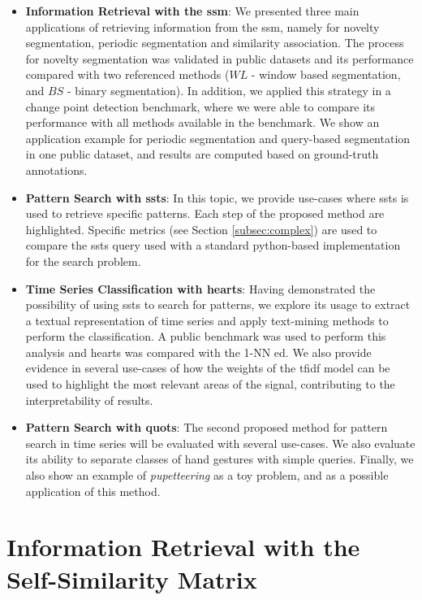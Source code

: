 \begin{itemize}
\item \textbf{Information Retrieval with the \gls{ssm}}:
We presented three main applications of retrieving information from the \gls{ssm}, namely for novelty segmentation, periodic segmentation and similarity association. The process for novelty segmentation was validated in public datasets and its performance compared with two referenced methods ($WL$ - window based segmentation, and $BS$ - binary segmentation). In addition, we applied this strategy in a change point detection benchmark, where we were able to compare its performance with all methods available in the benchmark. We show an application example for periodic segmentation and query-based segmentation in one public dataset, and results are computed based on ground-truth annotations.

\item \textbf{Pattern Search with \gls{ssts}}:
In this topic, we provide use-cases where \gls{ssts} is used to retrieve specific patterns. Each step of the proposed method are highlighted. Specific metrics (see Section \ref{subsec:complex}) are used to compare the \gls{ssts} query used with a standard python-based implementation for the search problem.

\item \textbf{Time Series Classification with \gls{hearts}}:
Having demonstrated the possibility of using \gls{ssts} to search for patterns, we explore its usage to extract a textual representation of time series and apply text-mining methods to perform the classification. A public benchmark was used to perform this analysis and \gls{hearts} was compared with the 1-NN \gls{ed}. We also provide evidence in several use-cases of how the weights of the \gls{tfidf} model can be used to highlight the most relevant areas of the signal, contributing to the interpretability of results.

\item \textbf{Pattern Search with \gls{quots}}:
The second proposed method for pattern search in time series will be evaluated with several use-cases. We also evaluate its ability to separate classes of hand gestures with simple queries. Finally, we also show an example of \textit{pupetteering} as a toy problem, and as a possible application of this method. 
\end{itemize}

\section{Information Retrieval with the Self-Similarity Matrix}

